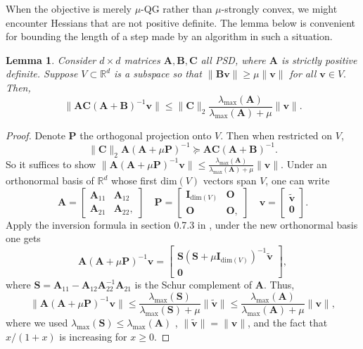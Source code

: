 \documentclass[11pt]{amsart}
\theoremstyle{plain}
\newtheorem{lemma}[theorem]{Lemma}
\theoremstyle{definition}
\theoremstyle{remark}
\def\R{\mathbb{R}}
\def\bP{\mathbf{P}}
\def\I{\mathbf{I}}
\def\A{\mathbf{A}}
\def\B{\mathbf{B}}
\def\I{\mathbf{I}}
\begin{document}
When the objective is merely $\mu$-QG rather than $\mu$-strongly convex, we might encounter Hessians that are not positive definite. The lemma below is convenient for bounding the length of a step made by an algorithm in such a situation.

\begin{lemma}\label{lem:ABCv}
    Consider $d\times d$ matrices $\A,\B, \mathbf{C}$ all PSD, where $\A$ is strictly positive definite. Suppose $V\subset \R^{d}$ is a subspace so that $\|\B\mathbf{v}\|\geq \mu\|\mathbf{v}\|$ for all $\mathbf{v}\in V.$ Then,
    \[
    \|\A\mathbf{C}(\A+\B)^{-1}\mathbf{v}\|\leq \|\mathbf{C}\|_2\frac{\lambda_{\max}(\A)}{\lambda_{\max}(\A)+\mu}\|\mathbf{v}\|.
    \]
\end{lemma}
\begin{proof}
    Denote $\bP$ the orthogonal projection onto $V.$ Then when restricted on $V$, 
    \[
    \|\mathbf{C}\|_{2}\A(\A+\mu\bP)^{-1}\succcurlyeq\A\mathbf{C}(\A+\B)^{-1}.
    \]
    So it suffices to show $\|\A(\A+\mu\bP)^{-1}\mathbf{v}\|\leq \frac{\lambda_{\max}(\A)}{\lambda_{\max}(\A)+\mu}\|\mathbf{v}\|.$ Under an orthonormal basis of $\R^d$ whose first $\text{dim}(V)$ vectors span $V$, one can write
    \[
    \A=\begin{bmatrix}
        \A_{11} & \A_{12}\\
        \A_{21} & \A_{22},
    \end{bmatrix}\quad
    \bP=\begin{bmatrix}
        \I_{\text{dim}(V)} & \mathbf{O}\\
        \mathbf{O} & \mathbf{O},
    \end{bmatrix}\quad
    \mathbf{v}=\begin{bmatrix}
        \widetilde{\mathbf{v}} \\
        \mathbf{0}
    \end{bmatrix}.
    \]
    Apply the inversion formula in section 0.7.3 in \cite{horn2012matrix}, under the new orthonormal basis one gets
    \[
    \A(\A+\mu\bP)^{-1}\mathbf{v}=\begin{bmatrix}
        \mathbf{S}(\mathbf{S}+\mu\I_{\text{dim}(V)})^{-1}\widetilde{\mathbf{v}}\\
        \mathbf{0}
    \end{bmatrix},
    \]
    where $\mathbf{S}=\A_{11}-\A_{12}\A_{22}^{-1}\A_{21}$ is the Schur complement of $\A$. Thus,
    \[
    \|\A(\A+\mu\bP)^{-1}\mathbf{v}\|\leq \frac{\lambda_{\max}(\mathbf{S})}{\lambda_{\max}(\mathbf{S})+\mu}\|\widetilde{\mathbf{v}}\|\le \frac{\lambda_{\max}(\A)}{\lambda_{\max}(\A)+\mu}\|\mathbf{v}\|,
    \]
    where we used $\lambda_{\max}(\mathbf{S})\le \lambda_{\max}(\A)$ \cite{horn2012matrix}, $\|\widetilde{\mathbf{v}}\|=\|\mathbf{v}\|$, and the fact that $x/(1+x)$ is increasing for $x\geq 0.$
\end{proof}
\end{document}
